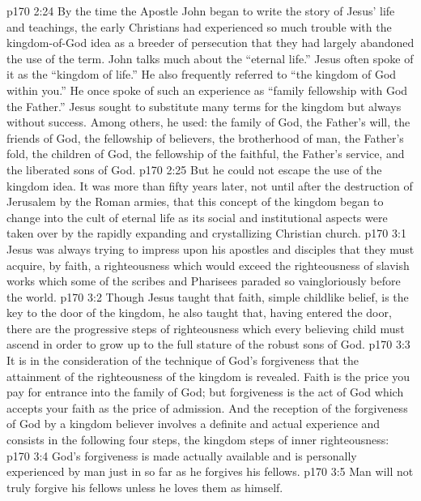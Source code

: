 \vs p170 2:24 By the time the Apostle John began to write the story of Jesus’ life and teachings, the early Christians had experienced so much trouble with the kingdom\hyp{}of\hyp{}God idea as a breeder of persecution that they had largely abandoned the use of the term. John talks much about the “eternal life.” Jesus often spoke of it as the \textcolor{ubdarkred}{“kingdom of life.”} He also frequently referred to \textcolor{ubdarkred}{“the kingdom of God within you.”} He once spoke of such an experience as \textcolor{ubdarkred}{“family fellowship with God the Father.”} Jesus sought to substitute many terms for the kingdom but always without success. Among others, he used: the family of God, the Father’s will, the friends of God, the fellowship of believers, the brotherhood of man, the Father’s fold, the children of God, the fellowship of the faithful, the Father’s service, and the liberated sons of God.
\vs p170 2:25 But he could not escape the use of the kingdom idea. It was more than fifty years later, not until after the destruction of Jerusalem by the Roman armies, that this concept of the kingdom began to change into the cult of eternal life as its social and institutional aspects were taken over by the rapidly expanding and crystallizing Christian church.
\vs p170 3:1 Jesus was always trying to impress upon his apostles and disciples that they must acquire, by faith, a righteousness which would exceed the righteousness of slavish works which some of the scribes and Pharisees paraded so vaingloriously before the world.
\vs p170 3:2 Though Jesus taught that faith, simple childlike belief, is the key to the door of the kingdom, he also taught that, having entered the door, there are the progressive steps of righteousness which every believing child must ascend in order to grow up to the full stature of the robust sons of God.
\vs p170 3:3 It is in the consideration of the technique of  God’s forgiveness that the attainment of the righteousness of the kingdom is revealed. Faith is the price you pay for entrance into the family of God; but forgiveness is the act of God which accepts your faith as the price of admission. And the reception of the forgiveness of God by a kingdom believer involves a definite and actual experience and consists in the following four steps, the kingdom steps of inner righteousness:
\vs p170 3:4 \bibnobreakspace God’s forgiveness is made actually available and is personally experienced by man just in so far as he forgives his fellows.
\vs p170 3:5 \bibnobreakspace Man will not truly forgive his fellows unless he loves them as himself.
